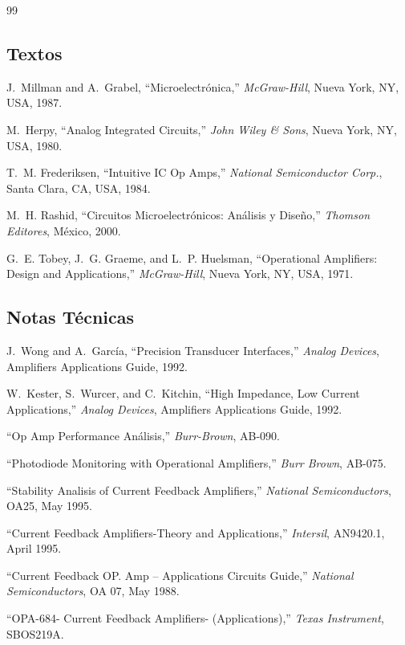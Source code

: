 
\begin{thebibliography}{99}
\setlength{\itemsep}{0.25em}
\setlength{\parskip}{0pt}
\setlength{\parsep}{0pt}
\subsection*{Textos}
J.~Millman and A.~Grabel,
``Microelectrónica,''
\emph{McGraw-Hill},
Nueva York, NY, USA, 1987.

M.~Herpy,
``Analog Integrated Circuits,''
\emph{John Wiley \& Sons},
Nueva York, NY, USA, 1980.

T.~M. Frederiksen,
``Intuitive IC Op Amps,''
\emph{National Semiconductor Corp.},
Santa Clara, CA, USA, 1984.

M.~H. Rashid,
``Circuitos Microelectrónicos: Análisis y Diseño,''
\emph{Thomson Editores},
México, 2000.

G.~E. Tobey, J.~G. Graeme, and L.~P. Huelsman,
``Operational Amplifiers: Design and Applications,''
\emph{McGraw-Hill},
Nueva York, NY, USA, 1971.
\subsection*{Notas Técnicas}
J.~Wong and A.~García,
``Precision Transducer Interfaces,''
\emph{Analog Devices},
Amplifiers Applications Guide, 1992.

W.~Kester, S.~Wurcer, and C.~Kitchin,
``High Impedance, Low Current Applications,''
\emph{Analog Devices},
Amplifiers Applications Guide, 1992.

``Op Amp Performance Análisis,''
\emph{Burr-Brown},
AB-090.

``Photodiode Monitoring with Operational Amplifiers,''
\emph{Burr Brown},
AB-075.

``Stability Analisis of  Current Feedback Amplifiers,''
\emph{National Semiconductors},
OA25, May 1995.

``Current Feedback Amplifiers-Theory and Applications,''
\emph{Intersil},
AN9420.1, April 1995.

``Current Feedback  OP. Amp – Applications Circuits Guide,''
\emph{National Semiconductors},
OA 07, May 1988.

``OPA-684- Current Feedback Amplifiers- (Applications),''
\emph{Texas Instrument},
SBOS219A.


\end{thebibliography}
